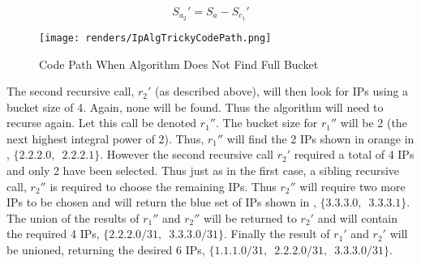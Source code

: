 \begin{equation}\label{eq:availableIpsSecondRecurse}
S_{a_2}' = S_a - S_{c_1}'
\end{equation}

\begin{figure}[H]
      \centering
      \texttt{[image: renders/IpAlgTrickyCodePath.png]}
      \caption{Code Path When Algorithm Does Not Find Full Bucket}
      \label{fig:ipAlgTrickyCodePath}
\end{figure}

The second recursive call, $r_2'$ (as described above), will then look for IPs using a bucket size of 4. Again, none will be found. Thus the algorithm will need to recurse again. Let this call be denoted $r_1''$. The bucket size for $r_1''$ will be 2 (the next highest integral power of 2). Thus, $r_1''$ will find the 2 IPs shown in orange in , $\{2.2.2.0,\enspace2.2.2.1\}$. However the second recursive call $r_2'$ required a total of 4 IPs and only 2 have been selected. Thus just as in the first case, a sibling recursive call, $r_2''$ is required to choose the remaining IPs. Thus $r_2''$ will require two more IPs to be chosen and will return the blue set of IPs shown in , $\{3.3.3.0,\enspace3.3.3.1\}$. The union of the results of $r_1''$ and $r_2''$ will be returned to $r_2'$ and will contain the required 4 IPs, $\{2.2.2.0/31,\enspace3.3.3.0/31\}$. Finally the result of $r_1'$ and $r_2'$ will be unioned, returning the desired 6 IPs, $\{1.1.1.0/31,\enspace2.2.2.0/31,\enspace3.3.3.0/31\}$.


